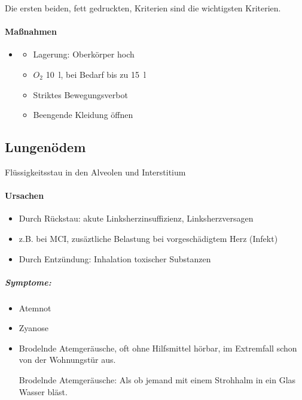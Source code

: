 Die ersten beiden, fett gedruckten, Kriterien sind die
wichtigsten Kriterien. 

\paragraph{Ma{\ss}nahmen}

\begin{itemize}
    \item \gTxMassVitBes
    \begin{itemize}
        \item Lagerung: Oberkörper hoch
        \item $O_2$ 10~l, bei Bedarf bis zu 15~l
    \end{itemize}
    \begin{itemize}
        \item Striktes Bewegungsverbot
        \item Beengende Kleidung öffnen
    \end{itemize}
\end{itemize}



\subsection{Lungenödem}\label{topic:lungenoedem}

{\mdseries
Fl\"ussigkeitsstau in den Alveolen und Interstitium}

\paragraph{Ursachen}

\begin{itemize}
    \item Durch R\"uckstau: akute Linksherzinsuffizienz, Linksherzversagen
    
    \item z.B. bei MCI, zusäztliche Belastung bei vorgeschädigtem Herz
    (Infekt)
    
    \item Durch Entz\"undung: Inhalation toxischer Substanzen
    
\end{itemize}

\subparagraph*{
Symptome:}

\begin{itemize}
    \item Atemnot
    
    \item Zyanose
    
    \item {}Brodelnde Atemgeräusche, oft
    ohne Hilfsmittel hörbar, im Extremfall schon von der Wohnungst\"ur
    aus.
    
    \begin{center}

{\mdseries
Brodelnde Atemgeräusche: Als ob jemand mit einem Strohhalm in ein Glas
Wasser bläst.}


\end{center}
\end{itemize}

